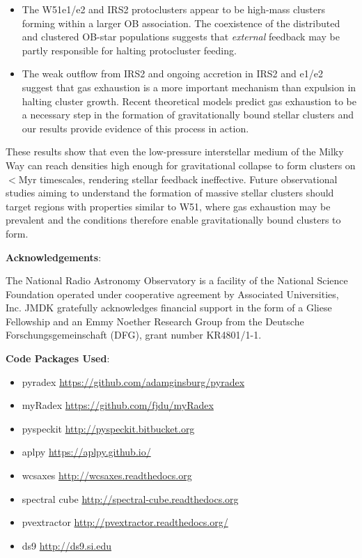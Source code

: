 \begin{itemize}
\item The W51e1/e2 and IRS2 protoclusters appear to be high-mass clusters
    forming within a larger OB association.  The coexistence of the distributed
    and clustered OB-star populations suggests that \emph{external} feedback
    may be partly responsible for halting protocluster feeding.

\item The weak outflow from IRS2 and ongoing accretion in IRS2 and e1/e2
    suggest that gas exhaustion is a more important mechanism than expulsion in
    halting cluster growth.
    Recent theoretical models predict gas exhaustion to be a necessary step in
    the formation of gravitationally bound stellar clusters
    \citep[e.g.,][]{Kruijssen2012a} and our results provide evidence of this
    process in action.

\end{itemize}

These results show that even the low-pressure interstellar medium of the Milky
Way can reach densities high enough for gravitational collapse to form clusters
on $<$Myr timescales, rendering stellar feedback ineffective.  Future
observational studies aiming to understand the formation of massive stellar
clusters should target regions with properties similar to W51, where gas
exhaustion may be prevalent and the conditions therefore enable gravitationally
bound clusters to form.



\textbf{Acknowledgements}:

The National Radio Astronomy Observatory is a facility of the National Science
Foundation operated under cooperative agreement by Associated Universities,
Inc.
JMDK gratefully acknowledges financial support in the form of a Gliese
Fellowship and an Emmy Noether Research Group from the Deutsche
Forschungsgemeinschaft (DFG), grant number KR4801/1-1.



\textbf{Code Packages Used}:

\begin{itemize}
    \item pyradex \url{https://github.com/adamginsburg/pyradex}
    \item myRadex \url{https://github.com/fjdu/myRadex}
    \item pyspeckit \url{http://pyspeckit.bitbucket.org} \citet{Ginsburg2011c}
    \item aplpy \url{https://aplpy.github.io/}
    \item wcsaxes \url{http://wcsaxes.readthedocs.org}
    \item spectral cube \url{http://spectral-cube.readthedocs.org}
    \item pvextractor \url{http://pvextractor.readthedocs.org/}
    \item ds9 \url{http://ds9.si.edu}
\end{itemize}

